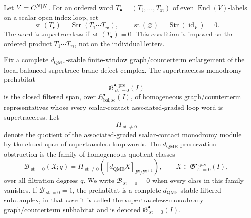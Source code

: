 \begin{defn}
\label{def:app-supertraceless-monodromy-prehabitat}
  Let \(V=C^{N|N}\).  For an ordered word
  \(T_\bullet=(T_1,\ldots,T_m)\) of even \(\operatorname{End}(V)\)-labels
  on a scalar open index loop, set
  \[
    \operatorname{st}(T_\bullet)
      =
    \operatorname{Str}(T_1\cdots T_m),
    \qquad
    \operatorname{st}(\varnothing)
      =
    \operatorname{Str}(\operatorname{id}_V)=0 .
  \]
  The word is supertraceless if \(\operatorname{st}(T_\bullet)=0\).
  This condition is imposed on the ordered product \(T_1\cdots T_m\),
  not on the individual letters.

  Fix a complete \(d_{\mathrm{QME}}\)-stable finite-window
  graph/counterterm enlargement of the local balanced supertrace
  brane-defect complex.  The supertraceless-monodromy
  prehabitat
  \[
    \mathfrak G^{\bullet,\mathrm{pre}}_{\operatorname{st}=0}(I)
  \]
  is the closed filtered span, over
  \(\mathfrak H^\bullet_{\mathrm{bal,sc}}(I)\), of homogeneous
  graph/counterterm representatives whose every scalar-contact
  associated-graded loop word is supertraceless.  Let
  \[
    \Pi_{\operatorname{st}\neq0}
  \]
  denote the quotient of the associated-graded scalar-contact monodromy
  module by the closed span of supertraceless loop words.  The
  \(d_{\mathrm{QME}}\)-preservation obstruction is the family of
  homogeneous quotient classes
  \[
    \mathcal B_{\operatorname{st}=0}(X;q)
      =
    \Pi_{\operatorname{st}\neq0}
    \left([d_{\mathrm{QME}}X]_{F^q/F^{q+1}}\right),
    \qquad
    X\in\mathfrak G^{\bullet,\mathrm{pre}}_{\operatorname{st}=0}(I),
  \]
  over all filtration degrees \(q\).  We write
  \(\mathcal B_{\operatorname{st}=0}=0\) when every class in this family
  vanishes.
  If \(\mathcal B_{\operatorname{st}=0}=0\), the prehabitat is a complete
  \(d_{\mathrm{QME}}\)-stable filtered subcomplex; in that case it is
  called the supertraceless-monodromy graph/counterterm subhabitat and
  is denoted
  \(\mathfrak G^\bullet_{\operatorname{st}=0}(I)\).
\end{defn}

